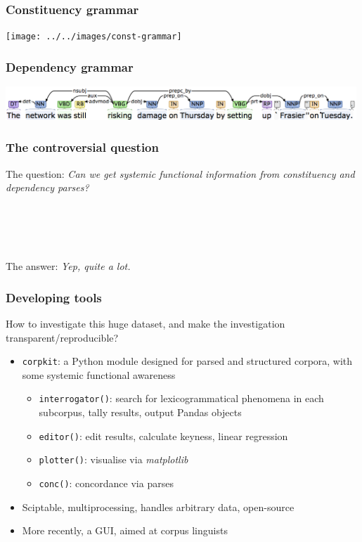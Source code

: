 \documentclass{beamer}       %
\begin{document}
\begin{frame}
    \frametitle{Constituency grammar}
    \centering
    \texttt{[image: ../../images/const-grammar]}
\end{frame}

\begin{frame}
    \frametitle{Dependency grammar}
    \centering
    \includegraphics[width=0.99\textwidth]{../../images/depparse}
\end{frame}

\begin{frame}\frametitle{The controversial question}

The question: \emph{Can we get systemic functional information from constituency and dependency parses?}

~\\~\\~\\~\\

The answer: \emph{Yep, quite a lot.}
\end{frame}


\begin{frame}\frametitle{Developing tools}
How to investigate this huge dataset, and make the investigation transparent\slash reproducible?

\begin{itemize}
    \item \texttt{corpkit}: a Python module designed for parsed and structured corpora, with some systemic functional awareness
    \begin{itemize}
        \item \texttt{interrogator()}: search for lexicogrammatical phenomena in each subcorpus, tally results, output Pandas objects
        \item \texttt{editor()}: edit results, calculate keyness, linear regression 
        \item \texttt{plotter()}: visualise via \emph{matplotlib} 
        \item \texttt{conc()}: concordance via parses 
    \end{itemize}
    \item Sciptable, multiprocessing, handles arbitrary data, open-source
    \item More recently, a GUI, aimed at corpus linguists
\end{itemize}
\end{frame}
\end{document}
